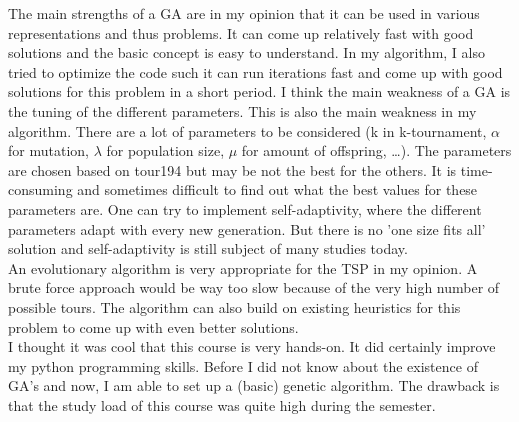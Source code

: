 \documentclass[a4paper,10pt]{article}
\newcommand{\ReplaceMe}[1]{{\color{blue}#1}}
\newcommand{\RemoveMe}[1]{{\color{purple}#1}}
\begin{document}

The main strengths of a GA are in my opinion that it can be used in various representations and thus problems. It can come up relatively fast with good solutions and the basic concept is easy to understand. In my algorithm, I also tried to optimize the code such it can run iterations fast and come up with good solutions for this problem in a short period.
I think the main weakness of a GA is the tuning of the different parameters. This is also the main weakness in my algorithm. There are a lot of parameters to be considered (k in k-tournament, $\alpha$ for mutation, $\lambda$ for population size, $\mu$ for amount of offspring, \ldots). The parameters are chosen based on tour194 but may be not the best for the others. It is time-consuming and sometimes difficult to find out what the best values for these parameters are. One can try to implement self-adaptivity, where the different parameters adapt with every new generation. But there is no 'one size fits all' solution and self-adaptivity is still subject of many studies today.  \\

An evolutionary algorithm is very appropriate for the TSP in my opinion. A brute force approach would be way too slow because of the very high number of possible tours. The algorithm can also build on existing heuristics for this problem to come up with even better solutions. \\

I thought it was cool that this course is very hands-on. It did certainly improve my python programming skills. Before I did not know about the existence of GA's and now, I am able to set up a (basic) genetic algorithm. The drawback is that the study load of this course was quite high during the semester.







\end{document}
